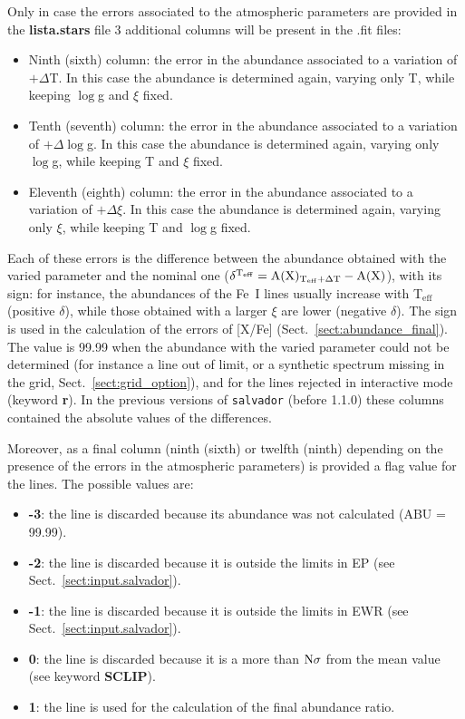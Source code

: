 \documentclass[modern]{aastex701}
\begin{document}
Only in case the errors associated to the atmospheric parameters are provided in the \textbf{lista.stars} file 3 additional columns will be present in the .fit files:
\begin{itemize}
    \item Ninth (sixth) column: the error in the abundance associated to a variation of $+\Delta$T. In this case the abundance is determined again, varying only T, while keeping $\log$g and $\xi$ fixed.
    \item Tenth (seventh) column: the error in the abundance associated to a variation of $+\Delta \log$g. In this case the abundance is determined again, varying only $\log$g, while keeping T and $\xi$ fixed.
    \item Eleventh (eighth) column: the error in the abundance associated to a variation of $+\Delta \xi$. In this case the abundance is determined again, varying only $\xi$, while keeping T and $\log$g fixed.
\end{itemize}
Each of these errors is the difference between the abundance obtained with the varied parameter and the nominal one ($\rm \delta^{T_{eff}} = A(X)_{T_{eff}+\Delta T} - A(X)$), with its sign: for instance, the abundances of the Fe~I lines usually increase with T$_{\mathrm{eff}}$ (positive $\delta$), while those obtained with a larger $\xi$ are lower (negative $\delta$). The sign is used in the calculation of the errors of [X/Fe] (Sect.~\ref{sect:abundance_final}). The value is 99.99 when the abundance with the varied parameter could not be determined (for instance a line out of limit, or a synthetic spectrum missing in the grid, Sect.~\ref{sect:grid_option}), and for the lines rejected in interactive mode (keyword {\bf r}). In the previous versions of \texttt{salvador} (before 1.1.0) these columns contained the absolute values of the differences.

Moreover, as a final column (ninth (sixth) or twelfth (ninth) depending on the presence of the errors in the atmospheric parameters) is provided a flag value for the lines. The possible values are:
\begin{itemize}
    \item {\bf -3}: the line is discarded because its abundance was not calculated (ABU = 99.99). 
    \item {\bf -2}: the line is discarded because it is outside the limits in EP (see Sect.~\ref{sect:input.salvador}).
    \item {\bf -1}: the line is discarded because it is outside the limits in EWR (see Sect.~\ref{sect:input.salvador}).
    \item {\bf 0}: the line is discarded because it is a more than $\rm N\sigma$ from the mean value (see keyword {\bf SCLIP}).
    \item {\bf 1}: the line is used for the calculation of the final abundance ratio.   
\end{itemize}
\end{document}

